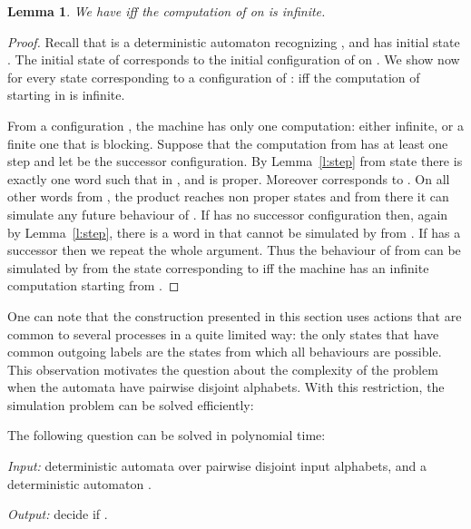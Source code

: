 \documentclass{LMCS}
\theoremstyle{plain}\newtheorem{remark}{Remark}
\theoremstyle{plain}\newtheorem{lemma}[thm]{Lemma}
\begin{document}
\begin{lemma}
  We have  iff the computation of  on  is
  infinite. 
\end{lemma}

\begin{proof}
  Recall that  is a deterministic automaton recognizing
  , and has initial state .  
The initial state of  corresponds to the initial
  configuration  of  on . We show now for every state 
 corresponding to a configuration  of :   iff the 
computation of  starting in  is infinite.

From a configuration , the machine  has only one computation: either
infinite, or a finite one that is blocking. Suppose that the computation
from  has at least one step and let  be the successor
configuration. By Lemma~\ref{l:step} from state  there is exactly
one word  such that  in ,
and  is proper.  Moreover 
corresponds to . On all other words from , the product
 reaches non proper states and from there it can simulate any
future behaviour of .  If  has no successor configuration
then, again by Lemma~\ref{l:step}, there is a word in  that
cannot be simulated by  from . If  has a successor
then we repeat the whole argument. Thus the behaviour of  from 
can be simulated by  from the state corresponding to 
iff the machine  has an infinite computation starting from .

\end{proof}

\medskip

One can note that the construction presented in this section uses
actions that are common to several processes in a quite limited way:
the only states that have common outgoing labels are the  states
from which all behaviours are possible. This observation motivates the
question about the complexity of the problem when the
automata  have pairwise disjoint alphabets. With
this restriction, the simulation problem can be solved efficiently:

\begin{thm}
The following question can be solved in polynomial time:

\emph{Input:}  deterministic automata
 over pairwise disjoint input alphabets, 
and a deterministic automaton .

\emph{Output:} decide if
.
\end{thm}
\end{document}
